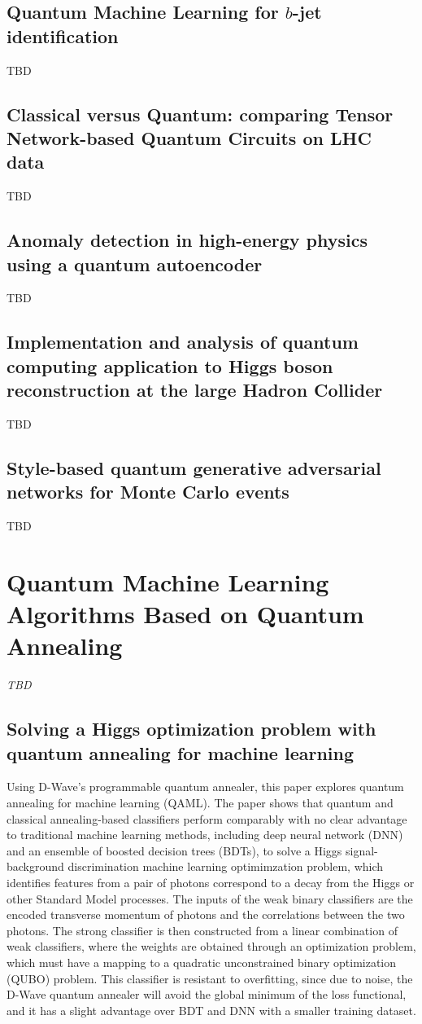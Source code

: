 \subsection{Quantum Machine Learning for $b$-jet identification~\cite{Gianelle:2022unu}}
TBD
\subsection{Classical versus Quantum: comparing Tensor Network-based Quantum Circuits on LHC data~\cite{Araz:2022haf}}
TBD
\subsection{Anomaly detection in high-energy physics using a quantum autoencoder~\cite{Ngairangbam:2021yma}}
TBD
\subsection{Implementation and analysis of quantum computing application to Higgs boson reconstruction at the large Hadron Collider~\cite{AlexiadesArmenakas:2021lrs}}
TBD
\subsection{Style-based quantum generative adversarial networks for Monte Carlo events~\cite{Bravo-Prieto:2021ehz}}
TBD


\section{Quantum Machine Learning Algorithms Based on Quantum Annealing}

\textit{TBD}

\subsection{Solving a Higgs optimization problem with quantum annealing for machine learning~\cite{Mott:2017xdb}}
Using D-Wave's programmable quantum annealer, this paper explores quantum annealing for machine learning (QAML). The paper shows that quantum and classical annealing-based classifiers perform comparably with no clear advantage to traditional machine learning methods, including deep neural network (DNN) and an ensemble of boosted decision trees (BDTs), to solve a Higgs signal-background discrimination machine learning optimimzation problem, which identifies features from a pair of photons correspond to a decay from the Higgs or other Standard Model processes. The inputs of the weak binary classifiers are the encoded transverse momentum of photons and the correlations between the two photons. The strong classifier is then constructed from a linear combination of weak classifiers, where the weights are obtained through an optimization problem, which must have a mapping to a quadratic unconstrained binary optimization (QUBO) problem. This classifier is resistant to overfitting, since due to noise, the D-Wave quantum annealer will avoid the global minimum of the loss functional, and it has a slight advantage over BDT and DNN with a smaller training dataset.
